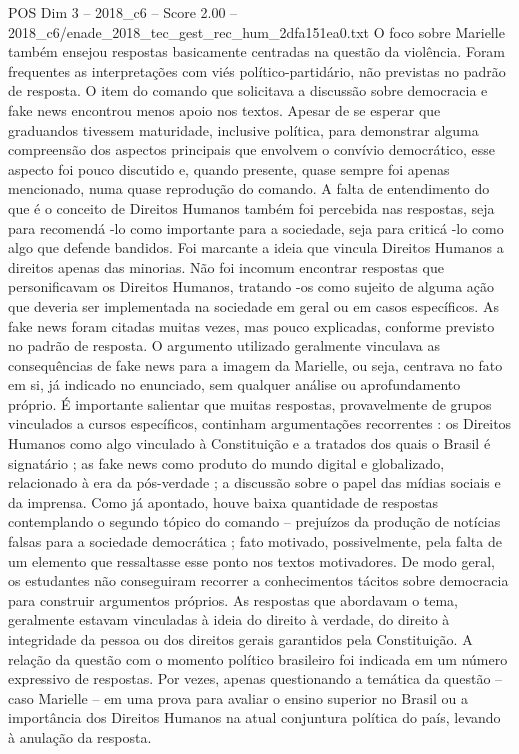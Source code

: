 \begin{textsample}{POS Dim 3 – 2018\_c6 – Score 2.00 – 2018\_c6/enade\_2018\_tec\_gest\_rec\_hum\_2dfa151ea0.txt}
O foco sobre Marielle também ensejou respostas basicamente centradas na questão da violência.
Foram frequentes as interpretações com viés político-partidário, não previstas no padrão de resposta.
O item do comando que solicitava a discussão sobre democracia e fake news encontrou menos apoio nos textos.
Apesar de se esperar que graduandos tivessem maturidade, inclusive política, para demonstrar alguma compreensão dos aspectos principais que envolvem o convívio democrático, esse aspecto foi pouco discutido e, quando presente, quase sempre foi apenas mencionado, numa quase reprodução do comando.
A falta de entendimento do que é o conceito de Direitos Humanos também foi percebida nas respostas, seja para recomendá -lo como importante para a sociedade, seja para criticá -lo como algo que defende bandidos.
Foi marcante a ideia que vincula Direitos Humanos a direitos apenas das minorias.
Não foi incomum encontrar respostas que personificavam os Direitos Humanos, tratando -os como sujeito de alguma ação que deveria ser implementada na sociedade em geral ou em casos específicos.
As fake news foram citadas muitas vezes, mas pouco explicadas, conforme previsto no padrão de resposta.
O argumento utilizado geralmente vinculava as consequências de fake news para a imagem da Marielle, ou seja, centrava no fato em si, já indicado no enunciado, sem qualquer análise ou aprofundamento próprio.
É importante salientar que muitas respostas, provavelmente de grupos vinculados a cursos específicos, continham argumentações recorrentes : os Direitos Humanos como algo vinculado à Constituição e a tratados dos quais o Brasil é signatário ; as fake news como produto do mundo digital e globalizado, relacionado à era da pós-verdade ; a discussão sobre o papel das mídias sociais e da imprensa.
Como já apontado, houve baixa quantidade de respostas contemplando o segundo tópico do comando – prejuízos da produção de notícias falsas para a sociedade democrática ; fato motivado, possivelmente, pela falta de um elemento que ressaltasse esse ponto nos textos motivadores.
De modo geral, os estudantes não conseguiram recorrer a conhecimentos tácitos sobre democracia para construir argumentos próprios.
As respostas que abordavam o tema, geralmente estavam vinculadas à ideia do direito à verdade, do direito à integridade da pessoa ou dos direitos gerais garantidos pela Constituição.
A relação da questão com o momento político brasileiro foi indicada em um número expressivo de respostas.
Por vezes, apenas questionando a temática da questão – caso Marielle – em uma prova para avaliar o ensino superior no Brasil ou a importância dos Direitos Humanos na atual conjuntura política do país, levando à anulação da resposta.

\end{textsample}
